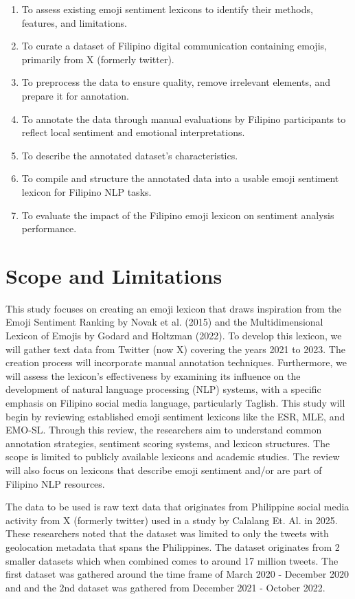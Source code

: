 \begin{enumerate}
	\item To assess existing emoji sentiment lexicons to identify their methods, features, and limitations.
	\item To curate a dataset of Filipino digital communication containing emojis, primarily from X (formerly twitter).
	\item To preprocess the data to ensure quality, remove irrelevant elements, and prepare it for annotation.
	\item To annotate the data through manual evaluations by Filipino participants to reflect local sentiment and emotional interpretations.
	\item To describe the annotated dataset’s characteristics.
	\item To compile and structure the annotated data into a usable emoji sentiment lexicon for Filipino NLP tasks.
	\item To evaluate the impact of the Filipino emoji lexicon on sentiment analysis performance.
\end{enumerate}

\section{Scope and Limitations}
This study focuses on creating an emoji lexicon that draws inspiration from the Emoji Sentiment Ranking by Novak et al. (2015) and the Multidimensional Lexicon of Emojis by Godard and Holtzman (2022). To develop this lexicon, we will gather text data from Twitter (now X) covering the years 2021 to 2023. The creation process will incorporate manual annotation techniques. Furthermore, we will assess the lexicon's effectiveness by examining its influence on the development of natural language processing (NLP) systems, with a specific emphasis on Filipino social media language, particularly Taglish.
This study will begin by reviewing established emoji sentiment lexicons like the ESR, MLE, and EMO-SL. Through this review, the researchers aim to understand common annotation strategies, sentiment scoring systems, and lexicon structures. The scope is limited to publicly available lexicons and academic studies. The review will also focus on lexicons that describe emoji sentiment and/or are part of Filipino NLP resources.

The data to be used is raw text data that originates from Philippine social media activity from X (formerly twitter) used in a study by Calalang Et. Al. in 2025. These researchers noted that the dataset was limited to only the tweets with geolocation metadata that spans the Philippines. The dataset originates from 2 smaller datasets which when combined comes to around 17 million tweets. The first dataset was gathered around the time frame of March 2020 - December 2020 and and the 2nd dataset was gathered from December 2021 - October 2022. 

